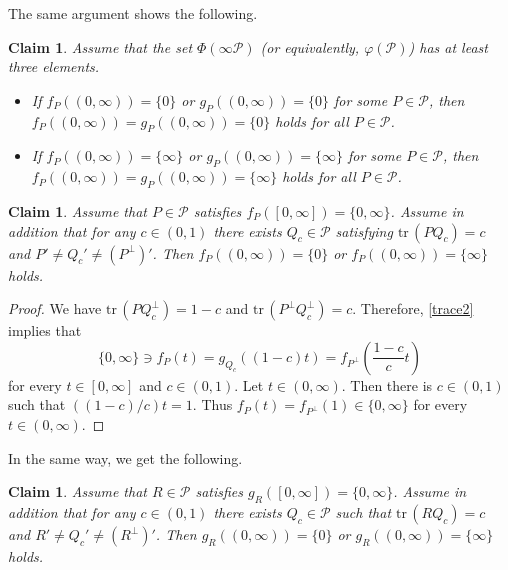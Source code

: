\documentclass[10pt]{amsart}
\newtheorem{claim}[theorem]{Claim}
\theoremstyle{definition}
\theoremstyle{remark}
\numberwithin{subsection}{section}
\numberwithin{equation}{section}
\newcommand\cP{{\mathcal{P}}}
\begin{document}
The same argument shows the following.
\begin{claim}\label{zeroorinfty}
Assume that the set $\Phi(\infty \cP)$ (or equivalently, $\varphi(\cP)$) has at least three elements. 
\begin{itemize}
\item If $f_{P}((0, \infty))= \{0\}$ or $g_{P}((0, \infty))= \{0\}$ for some $P\in \cP$, then $f_{P}((0, \infty))=g_P((0,\infty))= \{0\}$ holds for all $P\in \cP$. 
\item If $f_{P}((0, \infty))= \{\infty\}$ or $g_{P}((0, \infty))= \{\infty\}$ for some $P\in \cP$, then $f_{P}((0, \infty))=g_P((0,\infty))= \{\infty\}$ holds for all $P\in \cP$. 
\end{itemize}
\end{claim}



\begin{claim}\label{qc}
Assume that $P\in \cP$ satisfies $f_P([0, \infty])=\{0, \infty\}$.
Assume in addition that for any $c\in (0, 1)$ there exists $Q_c\in \cP$ satisfying $\mathrm{tr}\,(PQ_c)=c$ and $P'\neq Q_c'\neq (P^\perp)'$.
Then $f_P((0, \infty))=\{0\}$ or $f_P((0, \infty))=\{\infty\}$ holds.
\end{claim}
\begin{proof}
We have $\mathrm{tr}\, (PQ_c^\perp) =1-c$ and  $\mathrm{tr}\, (P^\perp Q_c^\perp) =c$.
Therefore, \eqref{trace2} implies that 
\[
\{0, \infty\} \ni f_{P}(t)=g_{Q_c}((1-c)t)=f_{P^\perp}\left(\frac{1-c}{c}t\right)
\]
for every $t\in [0, \infty]$ and $c\in (0,1)$. 
Let $t \in (0, \infty)$. Then there is $c \in (0,1)$ such that $((1-c)/c)t = 1$. 
Thus $f_P(t)=f_{P^\perp} (1)\in \{0, \infty\}$ for every $t\in (0,\infty)$.
\end{proof}

In the same way, we get the following.

\begin{claim}\label{qc1}
Assume that $R\in \cP$ satisfies $g_R([0, \infty])=\{0, \infty\}$.
Assume in addition that for any $c\in (0, 1)$ there exists $Q_c\in \cP$ such that $\mathrm{tr}\,(RQ_c)=c$ and $R'\neq Q_c'\neq (R^\perp)'$.
Then $g_R((0, \infty))=\{0\}$ or $g_R((0, \infty))=\{\infty\}$ holds.
\end{claim}
\end{document}

